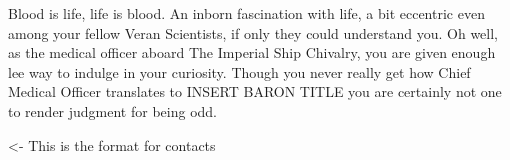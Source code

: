 \documentclass[char]{guildcamp4}
\begin{document}
\name{\cVthree{}}

Blood is life, life is blood.
An inborn fascination with life, a bit eccentric even among your fellow Veran Scientists, if only they could understand you. Oh well, as the 
medical officer aboard The Imperial Ship Chivalry, you are given enough lee way to indulge in your curiosity. Though you never really get how 
Chief Medical Officer translates to INSERT BARON TITLE you are certainly not one to render judgment for being odd.


\begin{itemz}[Goals]
	\item 
\end{itemz}

\begin{itemz}[Notes]
	\item 
\end{itemz}

\begin{contacts}
	\contact{\cVone{}} <- This is the format for contacts 
	\contact{\cVtwo{}}
	\contact{\cJoan{}}
	\contact{\cJulie{}}
	\contact{\cJames{}}
	\contact{\cRasputin{}}
	\contact{\cSpite{}}
	\contact{\cPlead{}}
\end{contacts}
\end{document}
